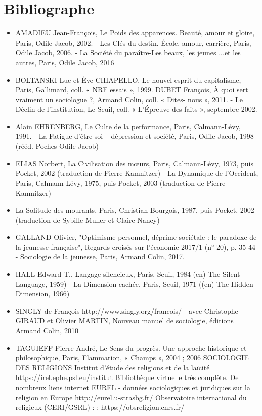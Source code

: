 \section{Bibliographe}
\begin{itemize}
\item   AMADIEU Jean-François, Le Poids des apparences. Beauté, amour et gloire, Paris, Odile Jacob, 2002. - Les Clés du destin. École, amour, carrière, Paris, Odile Jacob, 2006. - La Société du paraître-Les beaux, les jeunes ...et les autres, Paris, Odile Jacob, 2016 
\item BOLTANSKI Luc et Ève CHIAPELLO, Le nouvel esprit du capitalisme, Paris,  Gallimard, coll. « NRF essais », 1999. DUBET François, À quoi sert vraiment un sociologue ?, Armand Colin, coll. « Dites-  nous », 2011. - Le Déclin de l'institution, Le Seuil, coll. « L'Épreuve des faits », septembre 2002. 
\item Alain EHRENBERG, Le Culte de la performance, Paris, Calmann-Lévy, 1991. - La Fatigue d’être soi – dépression et société, Paris, Odile Jacob, 1998  (rééd. Poches Odile Jacob) 
\item ELIAS Norbert, La Civilisation des mœurs, Paris, Calmann-Lévy, 1973, puis Pocket, 2002 (traduction de Pierre Kamnitzer) - La Dynamique de l’Occident, Paris, Calmann-Lévy, 1975, puis Pocket, 2003 (traduction de Pierre Kamnitzer)
\item La Solitude des mourants, Paris, Christian Bourgois, 1987, puis Pocket, 2002 (traduction de Sybille Muller et Claire Nancy) 
\item GALLAND Olivier, "Optimisme personnel, déprime sociétale : le paradoxe de la jeunesse française", Regards croisés sur l’économie 2017/1 (n° 20), p. 35-44 - Sociologie de la jeunesse, Paris, Armand Colin, 2017. 
\item HALL Edward T., Langage silencieux, Paris, Seuil, 1984 (en) The Silent Language, 1959) - La Dimension cachée, Paris, Seuil, 1971 ((en) The Hidden Dimension, 1966) 
\item SINGLY de François http://www.singly.org/francois/ - avec Christophe GIRAUD et Olivier MARTIN, Nouveau manuel de sociologie, éditions Armand Colin, 2010 
\item TAGUIEFF Pierre-André,  Le Sens du progrès. Une approche historique et   philosophique, Paris, Flammarion, « Champs », 2004 ; 2006   SOCIOLOGIE DES RELIGIONS  Institut d’étude des religions et de la laïcité   https://irel.ephe.psl.eu/institut Bibliothèque virtuelle très complète. De nombreux liens internet EUREL - données sociologiques et juridiques sur la religion en Europe http://eurel.u-strasbg.fr/  Observatoire international du religieux (CERI/GSRL) :  : https://obsreligion.cnrs.fr/  

\end{itemize}
